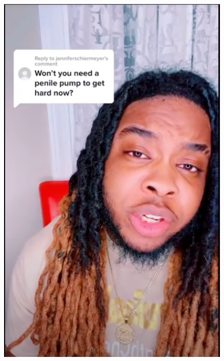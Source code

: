 \documentclass[11pt]{article}
\begin{document}
\begin{figure}[t]
\centering
\begin{minipage}{.21\textwidth}
  \centering
  \includegraphics[width=0.9\linewidth]{images/educative.png}
  \label{fig:test1}
\end{minipage}%
\begin{minipage}{.21\textwidth}
  \centering

\end{minipage}
\end{figure}
\end{document}

